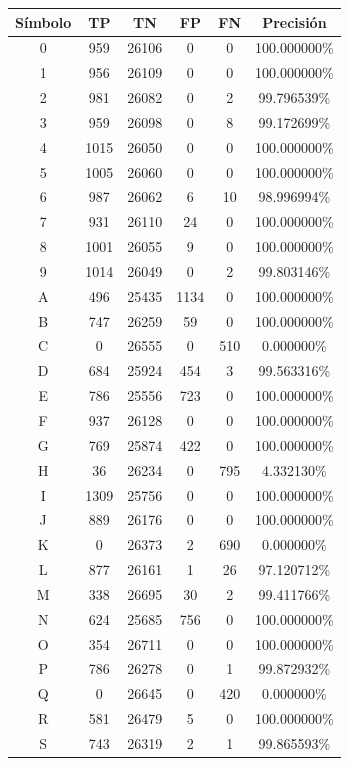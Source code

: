 \documentclass[a4paper, 11pt, oneside]{report}
\begin{document}
\begin{table}
\centering
\begin{tabular}{|c|c|c|c|c|c|}
\hline
Símbolo & TP & TN & FP & FN & Precisión \\ 
\hline
0 & 959 & 26106 & 0 & 0 & 100.000000\% \\ 
1 & 956 & 26109 & 0 & 0 & 100.000000\% \\ 
2 & 981 & 26082 & 0 & 2 & 99.796539\% \\ 
3 & 959 & 26098 & 0 & 8 & 99.172699\% \\ 
4 & 1015 & 26050 & 0 & 0 & 100.000000\% \\ 
5 & 1005 & 26060 & 0 & 0 & 100.000000\% \\ 
6 & 987 & 26062 & 6 & 10 & 98.996994\% \\ 
7 & 931 & 26110 & 24 & 0 & 100.000000\% \\ 
8 & 1001 & 26055 & 9 & 0 & 100.000000\% \\ 
9 & 1014 & 26049 & 0 & 2 & 99.803146\% \\ 
A & 496 & 25435 & 1134 & 0 & 100.000000\% \\ 
B & 747 & 26259 & 59 & 0 & 100.000000\% \\ 
C & 0 & 26555 & 0 & 510 & 0.000000\% \\ 
D & 684 & 25924 & 454 & 3 & 99.563316\% \\ 
E & 786 & 25556 & 723 & 0 & 100.000000\% \\ 
F & 937 & 26128 & 0 & 0 & 100.000000\% \\ 
G & 769 & 25874 & 422 & 0 & 100.000000\% \\ 
H & 36 & 26234 & 0 & 795 & 4.332130\% \\ 
I & 1309 & 25756 & 0 & 0 & 100.000000\% \\ 
J & 889 & 26176 & 0 & 0 & 100.000000\% \\ 
K & 0 & 26373 & 2 & 690 & 0.000000\% \\ 
L & 877 & 26161 & 1 & 26 & 97.120712\% \\ 
M & 338 & 26695 & 30 & 2 & 99.411766\% \\ 
N & 624 & 25685 & 756 & 0 & 100.000000\% \\ 
O & 354 & 26711 & 0 & 0 & 100.000000\% \\ 
P & 786 & 26278 & 0 & 1 & 99.872932\% \\ 
Q & 0 & 26645 & 0 & 420 & 0.000000\% \\ 
R & 581 & 26479 & 5 & 0 & 100.000000\% \\ 
S & 743 & 26319 & 2 & 1 & 99.865593\% \\ 

\end{tabular}
\end{table}
\end{document}
